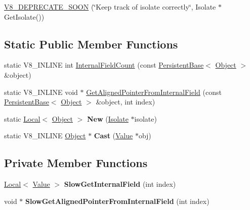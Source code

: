 \begin{DoxyCompactItemize}
\item 
\hyperlink{classv8_1_1_object_a5e7199a517d980396bb86f876b5bae0a}{V8\+\_\+\+D\+E\+P\+R\+E\+C\+A\+T\+E\+\_\+\+S\+O\+ON} (\char`\"{}Keep track of isolate correctly\char`\"{}, Isolate $\ast$Get\+Isolate())
\end{DoxyCompactItemize}
\subsection*{Static Public Member Functions}
\begin{DoxyCompactItemize}
\item 
static V8\+\_\+\+I\+N\+L\+I\+NE int \hyperlink{classv8_1_1_object_a324a71142f621a32bfe5738648718370}{Internal\+Field\+Count} (const \hyperlink{classv8_1_1_persistent_base}{Persistent\+Base}$<$ \hyperlink{classv8_1_1_object}{Object} $>$ \&object)
\item 
static V8\+\_\+\+I\+N\+L\+I\+NE void $\ast$ \hyperlink{classv8_1_1_object_a65b5a3dc93c0774594f8b0f2ab5481c8}{Get\+Aligned\+Pointer\+From\+Internal\+Field} (const \hyperlink{classv8_1_1_persistent_base}{Persistent\+Base}$<$ \hyperlink{classv8_1_1_object}{Object} $>$ \&object, int index)
\item 
static \hyperlink{classv8_1_1_local}{Local}$<$ \hyperlink{classv8_1_1_object}{Object} $>$ {\bfseries New} (\hyperlink{classv8_1_1_isolate}{Isolate} $\ast$isolate)\hypertarget{classv8_1_1_object_a3451edb58d1984b18652d925ec0bf756}{}\label{classv8_1_1_object_a3451edb58d1984b18652d925ec0bf756}

\item 
static V8\+\_\+\+I\+N\+L\+I\+NE \hyperlink{classv8_1_1_object}{Object} $\ast$ {\bfseries Cast} (\hyperlink{classv8_1_1_value}{Value} $\ast$obj)\hypertarget{classv8_1_1_object_a1f9ac46d0b164197318ce81dc0ec1343}{}\label{classv8_1_1_object_a1f9ac46d0b164197318ce81dc0ec1343}

\end{DoxyCompactItemize}
\subsection*{Private Member Functions}
\begin{DoxyCompactItemize}
\item 
\hyperlink{classv8_1_1_local}{Local}$<$ \hyperlink{classv8_1_1_value}{Value} $>$ {\bfseries Slow\+Get\+Internal\+Field} (int index)\hypertarget{classv8_1_1_object_a7086a91bf9de8b242f516a31761f31cf}{}\label{classv8_1_1_object_a7086a91bf9de8b242f516a31761f31cf}

\item 
void $\ast$ {\bfseries Slow\+Get\+Aligned\+Pointer\+From\+Internal\+Field} (int index)\hypertarget{classv8_1_1_object_a0baac908753276170f84b7e802546a7d}{}\label{classv8_1_1_object_a0baac908753276170f84b7e802546a7d}

\end{DoxyCompactItemize}
